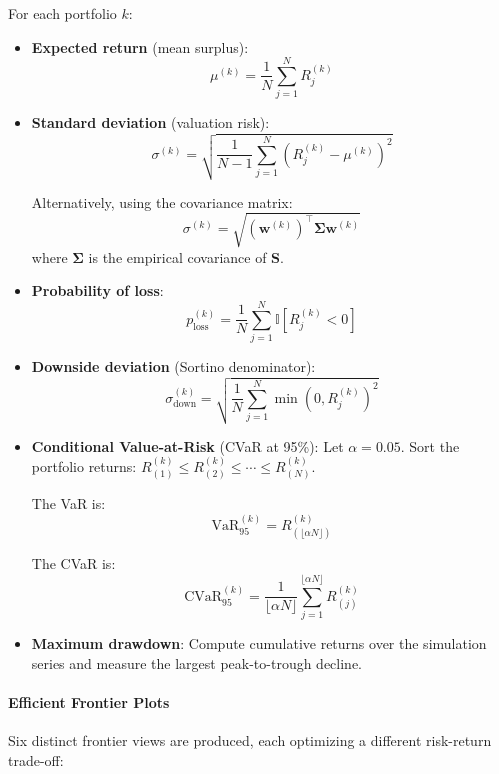 For each portfolio $k$:

\begin{itemize}
  \item \textbf{Expected return} (mean surplus):
  \[
  \mu^{(k)} = \frac{1}{N} \sum_{j=1}^N R^{(k)}_j
  \]

  \item \textbf{Standard deviation} (valuation risk):
  \[
  \sigma^{(k)} = \sqrt{\frac{1}{N-1} \sum_{j=1}^N (R^{(k)}_j - \mu^{(k)})^2}
  \]

  Alternatively, using the covariance matrix:
  \[
  \sigma^{(k)} = \sqrt{(\mathbf{w}^{(k)})^\top \mathbf{\Sigma} \mathbf{w}^{(k)}}
  \]
  where $\mathbf{\Sigma}$ is the empirical covariance of $\mathbf{S}$.

  \item \textbf{Probability of loss}:
  \[
  p_{\text{loss}}^{(k)} = \frac{1}{N} \sum_{j=1}^N \mathbb{I}[R^{(k)}_j < 0]
  \]

  \item \textbf{Downside deviation} (Sortino denominator):
  \[
  \sigma_{\text{down}}^{(k)} = \sqrt{\frac{1}{N} \sum_{j=1}^N \min(0, R^{(k)}_j)^2}
  \]

  \item \textbf{Conditional Value-at-Risk} (CVaR at 95\%):
  Let $\alpha = 0.05$. Sort the portfolio returns: $R^{(k)}_{(1)} \leq R^{(k)}_{(2)} \leq \cdots \leq R^{(k)}_{(N)}$.

  The VaR is:
  \[
  \text{VaR}_{95}^{(k)} = R^{(k)}_{(\lfloor \alpha N \rfloor)}
  \]

  The CVaR is:
  \[
  \text{CVaR}_{95}^{(k)} = \frac{1}{\lfloor \alpha N \rfloor} \sum_{j=1}^{\lfloor \alpha N \rfloor} R^{(k)}_{(j)}
  \]

  \item \textbf{Maximum drawdown}:
  Compute cumulative returns over the simulation series and measure the largest peak-to-trough decline.
\end{itemize}

\paragraph{Efficient Frontier Plots}

Six distinct frontier views are produced, each optimizing a different risk-return trade-off:

